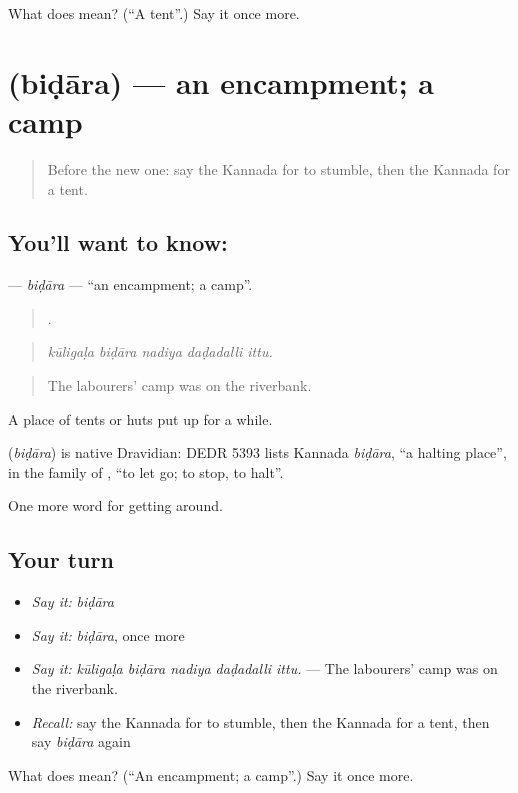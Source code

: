 \begin{tcolorbox}[breakable,colback=teal!4,colframe=teal!35!black,title={Before you move on}]
What does  mean? (\textquotedblleft{}A tent\textquotedblright{}.) Say it once more.
\end{tcolorbox}
\section[\texorpdfstring{\kn{ಬಿಡಾರ} (biḍāra)}{ಬಿಡಾರ (biḍāra)}]{ (biḍāra) — an encampment; a camp}

\label{lesson:KA-C459-bidara}



\begin{quote}
Before the new one: say the Kannada for to stumble, then the Kannada for a tent.
\end{quote}

\subsection*{You'll want to know: }
\textbf{} — \emph{biḍāra} — \textquotedblleft{}an encampment; a camp\textquotedblright{}.

\begin{quote}
    .
\end{quote}

\begin{quote}
\emph{kūligaḷa biḍāra nadiya daḍadalli ittu.}
\end{quote}

\begin{quote}
The labourers’ camp was on the riverbank.
\end{quote}

A place of tents or huts put up for a while.

\begin{cousinweb}
\textbf{} (\emph{biḍāra}) is native Dravidian: DEDR 5393 lists Kannada \emph{biḍāra}, \textquotedblleft{}a halting place\textquotedblright{}, in the family of , \textquotedblleft{}to let go; to stop, to halt\textquotedblright{}.
\end{cousinweb}

\begin{grammarlens}[title={What you've built}]
One more word for getting around.
\end{grammarlens}

\subsection*{Your turn}
\begin{itemize}
\raggedright
  \item \emph{Say it:} \emph{biḍāra}
  \item \emph{Say it:} \emph{biḍāra}, once more
  \item \emph{Say it:} \emph{kūligaḷa biḍāra nadiya daḍadalli ittu.} — The labourers’ camp was on the riverbank.
  \item \emph{Recall:} say the Kannada for to stumble, then the Kannada for a tent, then say \emph{biḍāra} again
\end{itemize}

\begin{tcolorbox}[breakable,colback=teal!4,colframe=teal!35!black,title={Before you move on}]
What does  mean? (\textquotedblleft{}An encampment; a camp\textquotedblright{}.) Say it once more.
\end{tcolorbox}

